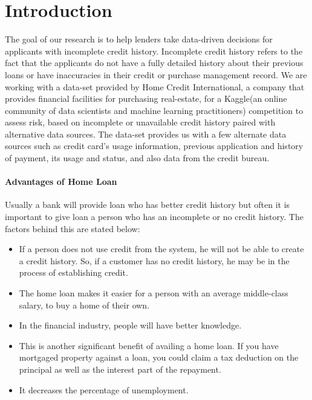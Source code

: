 \documentclass[sigconf, nonacm]{acmart}
\begin{document}
\maketitle

\section{Introduction}

The goal of our research is to help lenders take data-driven decisions for applicants with incomplete credit history. Incomplete credit history refers to the fact that the applicants do not have a fully detailed history about their previous loans or have inaccuracies in their credit or purchase management record. We are working with a data-set provided by Home Credit International, a company that provides financial facilities for purchasing real-estate, for a Kaggle(an online community of data scientists and machine learning practitioners) competition to assess risk, based on incomplete or unavailable credit history paired with alternative data sources. The data-set provides us with a few alternate data sources such as credit card's usage information, previous application and history of payment, its usage and status, and also data from the credit bureau.

\paragraph{Advantages of Home Loan}
Usually a bank will provide loan who has better credit history but often it is important to give loan a person who has an incomplete or no credit history. The factors behind this are stated below:
\begin{itemize}
	\item If a person does not use credit from the system, he will not be able to create a credit history. So, if a customer has no credit history, he may be in the process of establishing credit.
	\item The home loan makes it easier for a person with an average middle-class salary, to buy a home of their own.
	\item In the financial industry, people will have better knowledge.
	\item This is another significant benefit of availing a home loan. If you have mortgaged property against a loan, you could claim a tax deduction on the principal as well as the interest part of the repayment.
	\item It decreases the percentage of unemployment.
\end{itemize}
\end{document}
